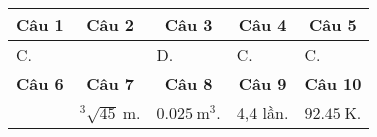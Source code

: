 \begin{longtable}[\textwidth]{|p{}|p{}|p{}|p{}|p{}|}
	\hline%
	\multicolumn{1}{|c}{\textbf{Câu 1}} & \multicolumn{1}{|c|}{\textbf{Câu 2}} & \multicolumn{1}{c|}{\textbf{Câu 3}} &
	\multicolumn{1}{c|}{\textbf{Câu 4}} &
	\multicolumn{1}{c|}{\textbf{Câu 5}} \\
	\hline
	C.&  & D. & C. & C. 	\\
	\hline
	
	\multicolumn{1}{|c|}{\textbf{Câu 6}} & \multicolumn{1}{c|}{\textbf{Câu 7}} & \multicolumn{1}{c|}{\textbf{Câu 8}} &
	\multicolumn{1}{c|}{\textbf{Câu 9}} &
	\multicolumn{1}{c|}{\textbf{Câu 10}}  \\ 
	\hline
	  & $^3\sqrt{45}\ \text{m}$. & $\SI{0.025}{\meter \cubed}$.&4,4 lần. & $\SI{92.45}{\kelvin}$.	\\
	\hline
\end{longtable}



